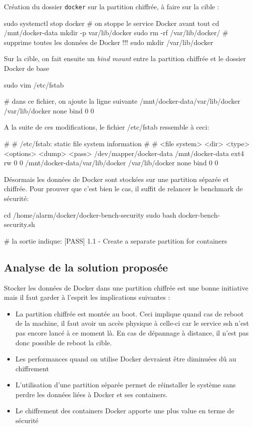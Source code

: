 \documentclass[11pt,a4paper,oneside]{report}
\newcommand{\code}[1]{\texttt{#1}}
\begin{document}
Création du dossier \code{docker} sur la partition chiffrée, à faire sur la cible :
\begin{bashcode}
sudo systemctl stop docker # on stoppe le service Docker avant tout
cd /mnt/docker-data
mkdir -p var/lib/docker
sudo rm -rf /var/lib/docker/ # supprime toutes les données de Docker !!!
sudo mkdir /var/lib/docker
\end{bashcode}

Sur la cible, on fait ensuite un \textit{bind mount} entre la partition chiffrée et le dossier Docker de base

\begin{bashcode}
sudo vim /etc/fstab

# dans ce fichier, on ajoute la ligne suivante
/mnt/docker-data/var/lib/docker /var/lib/docker none bind 0 0
\end{bashcode}

A la suite de ces modifications, le fichier /etc/fstab ressemble à ceci:
\begin{bashcode}
#
# /etc/fstab: static file system information
#
# <file system> <dir>   <type>  <options>       <dump>  <pass>
/dev/mapper/docker-data /mnt/docker-data ext4 rw 0 0
/mnt/docker-data/var/lib/docker /var/lib/docker none bind 0 0
\end{bashcode}


Désormais les données de Docker sont stockées sur une partition séparée et chiffrée. Pour prouver que c'est bien le cas, il suffit de relancer le benchmark de sécurité:

\begin{bashcode}
cd /home/alarm/docker/docker-bench-security
sudo bash docker-bench-security.sh

# la sortie indique:
[PASS] 1.1  - Create a separate partition for containers
\end{bashcode}


\subsection{Analyse de la solution proposée}
Stocker les données de Docker dans une partition chiffrée est une bonne initiative mais il faut garder à l'esprit les implications suivantes :
\begin{itemize}

\item La partition chiffrée est montée au boot. Ceci implique quand cas de reboot de la machine, il faut avoir un accès physique à celle-ci car le service ssh n'est pas encore lancé à ce moment là. En cas de dépannage à distance, il n'est pas donc possible de reboot la cible.
\item Les performances quand on utilise Docker devraient être diminuées dû au chiffrement
\item L'utilisation d'une partition séparée permet de réinstaller le système sans perdre les données liées à Docker et ses containers.
\item Le chiffrement des containers Docker apporte une plus value en terme de sécurité
\end{itemize}
\end{document}
